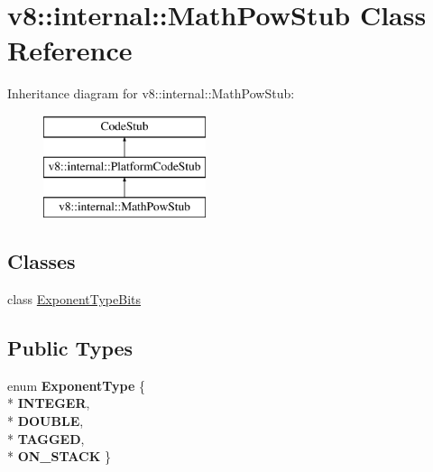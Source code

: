 \hypertarget{classv8_1_1internal_1_1_math_pow_stub}{}\section{v8\+:\+:internal\+:\+:Math\+Pow\+Stub Class Reference}
\label{classv8_1_1internal_1_1_math_pow_stub}
Inheritance diagram for v8\+:\+:internal\+:\+:Math\+Pow\+Stub\+:\begin{figure}[H]
\begin{center}
\leavevmode
\includegraphics[height=3.000000cm]{classv8_1_1internal_1_1_math_pow_stub}
\end{center}
\end{figure}
\subsection*{Classes}
\begin{DoxyCompactItemize}
\item 
class \hyperlink{classv8_1_1internal_1_1_math_pow_stub_1_1_exponent_type_bits}{Exponent\+Type\+Bits}
\end{DoxyCompactItemize}
\subsection*{Public Types}
\begin{DoxyCompactItemize}
\item 
enum {\bfseries Exponent\+Type} \{ \\*
{\bfseries I\+N\+T\+E\+G\+ER}, 
\\*
{\bfseries D\+O\+U\+B\+LE}, 
\\*
{\bfseries T\+A\+G\+G\+ED}, 
\\*
{\bfseries O\+N\+\_\+\+S\+T\+A\+CK}
 \}\hypertarget{classv8_1_1internal_1_1_math_pow_stub_a4d91d3bc7b619aa315c496c8c1e24c2c}{}\label{classv8_1_1internal_1_1_math_pow_stub_a4d91d3bc7b619aa315c496c8c1e24c2c}

\end{DoxyCompactItemize}
